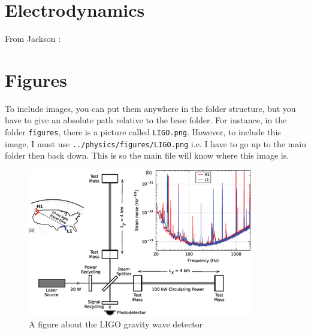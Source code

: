 \documentclass[../main/journal_template.tex]{subfiles}
\begin{document}
\section{Electrodynamics}\label{sec:physics_electrodyn}
From Jackson \cite{jackson1999classical}: 



\section{Figures}
To include images, you can put them anywhere in the folder structure, but you have to give an absolute path relative to the base folder.  For instance, in the folder \verb|figures|, there is a picture called \verb|LIGO.png|.  However, to include this image, I must use \verb|../physics/figures/LIGO.png| i.e. I have to go up to the main folder then back down.  This is so the main file will know where this image is.

\begin{figure}[ht]
\begin{center}
\includegraphics[scale=1]{../physics/figures/LIGO.png}
\end{center}
\caption{A figure about the LIGO gravity wave detector}
\label{somefig}
\end{figure}

\end{document}
